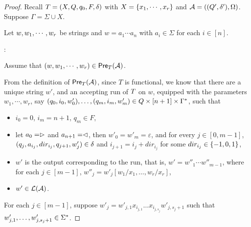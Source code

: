 \begin{proof}
Recall $T = (X, Q, q_0, F, \delta)$ with $X= \{x_1,\cdots, x_r\}$ and $\mathcal{A} =( (Q', \delta'), \Omega)$. 
Suppose $\Gamma = \Sigma \cup X$. 

Let $w, w_1, \cdots, w_r$ be strings and $w = a_1 \cdots a_n$ with $a_i \in \Sigma$ for each $i \in [n]$.

\smallskip

: 

\smallskip

Assume that $(w, w_1,\cdots, w_r) \in \textsf{Pre}_{T}(\mathcal{A})$.


From the definition of $\textsf{Pre}_{T}(\mathcal{A})$, since $T$ is functional, we know that there are a unique string $w'$, and an accepting run of $T$ on $w$, equipped with the parameters $w_1,\cdots, w_r$, say $(q_0, i_0, w'_0),\ldots, (q_m, i_m, w'_m) \in Q \times [n+1] \times \Gamma^*$, such that 
%
\begin{itemize}
\item $i_0=0$, $i_m = n+1$, $q_m \in F$, 
%
\item let $a_0 = \vartriangleright$ and $a_{n+1} = \vartriangleleft$,  then $w'_0 = w'_m = \varepsilon$, and for every $j \in [0, m-1]$, $(q_j, a_{i_j}, dir_{i_j}, q_{j+1}, w'_j) \in
        \delta$ and $i_{j+1} = i_j + dir_{i_j}$ for some $dir_{i_j} \in \{-1, 0, 1\}$, 
 \item $w'$ is the output corresponding to the run, that is, $ w' = w''_1 \cdots w''_{m-1}$, where for each $j \in [m-1]$, $w''_j = w'_j[w_1/x_1,\ldots, w_r/x_r]$,
 \item  $w' \in \mathcal{L}(\mathcal{A})$.
\end{itemize}

For each $j \in [m-1]$, suppose $w'_j = w'_{j, 1} x_{i_{j, 1}} \ldots x_{i_{j, s_j}} w'_{j, s_j+1}$ such that $w'_{j,1}, \ldots, w'_{j, s_j +1 } \in \Sigma^*$.


\end{proof}
